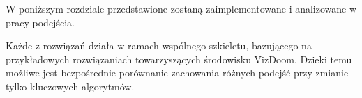 W poniższym rozdziale przedstawione zostaną zaimplementowane i analizowane w pracy podejścia.

Każde z rozwiązań działa w ramach wspólnego szkieletu, bazującego na przykładowych rozwiązaniach towarzyszących środowisku VizDoom. Dzieki temu możliwe jest bezpośrednie porównanie zachowania różnych podejść przy zmianie tylko kluczowych algorytmów.
